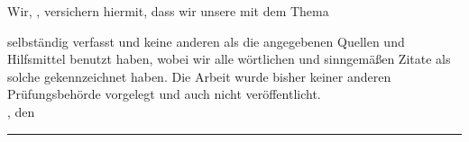\clearpage
{}

Wir, \autorName, versichern hiermit, dass wir unsere \textbf{\betreff} mit dem
Thema
\begin{quote}
\textit{\kompletterTitel}
\end{quote}
selbständig verfasst und keine anderen als die angegebenen Quellen und Hilfsmittel benutzt haben,
wobei wir alle wörtlichen und sinngemäßen Zitate als solche gekennzeichnet haben. Die Arbeit
wurde bisher keiner anderen Prüfungsbehörde vorgelegt und auch nicht veröffentlicht.\\[6ex]

\abgabeOrt, den \abgabeTermin


\rule[-0.2cm]{5.5cm}{0.5pt}

\textsc{\autorName}
